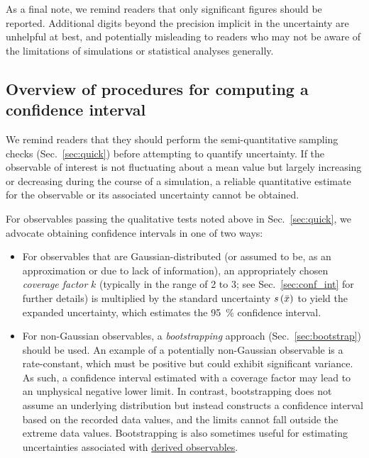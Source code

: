 As a final note, we remind readers that only significant figures should be reported.
Additional digits beyond the precision implicit in the uncertainty are unhelpful at best, and potentially misleading to readers who may not be aware of the limitations of simulations or statistical analyses generally.


\subsection{Overview of procedures for computing a confidence interval}
We remind readers that they should perform the semi-quantitative sampling checks (Sec.\ \ref{sec:quick}) before attempting to quantify uncertainty.  If the observable of interest is not fluctuating about a mean value but largely increasing or decreasing during the course of a simulation, a reliable quantitative estimate for the observable or its associated uncertainty cannot be obtained.

For observables passing the qualitative tests noted above in Sec.\ \ref{sec:quick}, we advocate obtaining confidence intervals in one of two ways:
\begin{itemize}
\item For observables that are Gaussian-distributed (or assumed to be, as an approximation or due to lack of information), an appropriately chosen \emph{coverage factor} $k$ (typically in the range of 2 to 3; see Sec.~\ref{sec:conf_int} for further details) is multiplied by the standard uncertainty $s\left( \bar{x} \right)$ to yield the expanded uncertainty, which estimates the 95~\% confidence interval.
\item For non-Gaussian observables, a \emph{bootstrapping} approach (Sec.~\ref{sec:bootstrap}) should be used.
  An example of a potentially non-Gaussian observable is a rate-constant, which must be positive but could exhibit significant variance.  As such, a confidence interval estimated with a coverage factor may lead to an unphysical negative lower limit.
  In contrast, bootstrapping does not assume an underlying distribution but instead constructs a confidence interval based on the recorded data values, and the limits cannot fall outside the extreme data values.
  Bootstrapping is also sometimes useful for estimating uncertainties associated with \hyperref[def:deriv_obs]{derived observables}.
\end{itemize}


